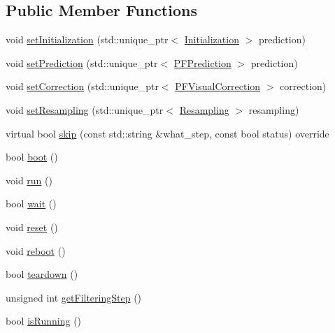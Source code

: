 \subsection*{Public Member Functions}
\begin{DoxyCompactItemize}
\item 
void \mbox{\hyperlink{classbfl_1_1VisualParticleFilter_ac254d164f51ddbef8c79f8f1a7863a8d}{set\+Initialization}} (std\+::unique\+\_\+ptr$<$ \mbox{\hyperlink{classbfl_1_1Initialization}{Initialization}} $>$ prediction)
\item 
void \mbox{\hyperlink{classbfl_1_1VisualParticleFilter_addc3e844aa3fe41fb2241eb2215d0c63}{set\+Prediction}} (std\+::unique\+\_\+ptr$<$ \mbox{\hyperlink{classbfl_1_1PFPrediction}{P\+F\+Prediction}} $>$ prediction)
\item 
void \mbox{\hyperlink{classbfl_1_1VisualParticleFilter_a77d03652f07d323b35aa478b0327b2f7}{set\+Correction}} (std\+::unique\+\_\+ptr$<$ \mbox{\hyperlink{classbfl_1_1PFVisualCorrection}{P\+F\+Visual\+Correction}} $>$ correction)
\item 
void \mbox{\hyperlink{classbfl_1_1VisualParticleFilter_a4e42410d311df91ee14e31790ada3674}{set\+Resampling}} (std\+::unique\+\_\+ptr$<$ \mbox{\hyperlink{classbfl_1_1Resampling}{Resampling}} $>$ resampling)
\item 
virtual bool \mbox{\hyperlink{classbfl_1_1VisualParticleFilter_aab68e455c645bc1b7b8c3c2b476c2f9c}{skip}} (const std\+::string \&what\+\_\+step, const bool status) override
\item 
bool \mbox{\hyperlink{classbfl_1_1FilteringAlgorithm_a96651f8464190c0a56d79219a1017147}{boot}} ()
\item 
void \mbox{\hyperlink{classbfl_1_1FilteringAlgorithm_a009cbe5f4bbb16967f6c6ddcaed8fbb1}{run}} ()
\item 
bool \mbox{\hyperlink{classbfl_1_1FilteringAlgorithm_a40372c24fa050eb0274371172df0a244}{wait}} ()
\item 
void \mbox{\hyperlink{classbfl_1_1FilteringAlgorithm_a2403c62fbd7bd7f5cda56a84f5f30331}{reset}} ()
\item 
void \mbox{\hyperlink{classbfl_1_1FilteringAlgorithm_a6022859aa985474fb997343cc935b11e}{reboot}} ()
\item 
bool \mbox{\hyperlink{classbfl_1_1FilteringAlgorithm_a1dc912d89ee8f96d4f3e8209865c5308}{teardown}} ()
\item 
unsigned int \mbox{\hyperlink{classbfl_1_1FilteringAlgorithm_a8c43b1f3dac30934c0a03de348d4a29d}{get\+Filtering\+Step}} ()
\item 
bool \mbox{\hyperlink{classbfl_1_1FilteringAlgorithm_a5cfecab2c778620e2557237472bb1721}{is\+Running}} ()
\end{DoxyCompactItemize}
